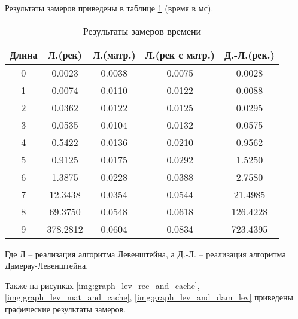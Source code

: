 Результаты замеров приведены в таблице \ref{tbl:time_mes} (время в мс).

\begin{table}[h]
	\begin{center}
		\begin{threeparttable}
			\captionsetup{justification=raggedright,singlelinecheck=off}
			\caption{Результаты замеров времени}
			\label{tbl:time_mes}
			\begin{tabular}{|c|c|c|c|c|}
				\hline
				Длина & Л.(рек) & Л.(матр.)& Л.(рек с матр.) & Д.-Л.(рек.)  \\
				\hline
				0 & 0.0023 & 0.0038 & 0.0075 & 0.0028 \\ 
				\hline
				1 & 0.0074 & 0.0110 & 0.0122 & 0.0088 \\ 
				\hline
				2 & 0.0362 & 0.0122 & 0.0125 & 0.0295 \\ 
				\hline
				3 & 0.0535 & 0.0104 & 0.0132 & 0.0575 \\ 
				\hline
				4 & 0.5422 & 0.0136 & 0.0210 & 0.9562 \\ 
				\hline
				5 & 0.9125 & 0.0175 & 0.0292 & 1.5250 \\ 
				\hline
				6 & 1.3875 & 0.0228 & 0.0388 & 2.7580 \\ 
				\hline
				7 & 12.3438 & 0.0354 & 0.0544 & 21.4985 \\ 
				\hline
				8 & 69.3750 & 0.0548 & 0.0618 & 126.4228 \\ 
				\hline
				9 & 378.2812 & 0.0604 & 0.0834 & 723.4395 \\ 
				\hline
			\end{tabular}
		\end{threeparttable}
	\end{center}
\end{table}
Где Л – реализация алгоритма Левенштейна, а Д.-Л. – реализация алгоритма Дамерау-Левенштейна.
\clearpage

Также на рисунках \ref{img:graph_lev_rec_and_cache}, \ref{img:graph_lev_mat_and_cache}, \ref{img:graph_lev_and_dam_lev} приведены графические результаты замеров.

\clearpage


